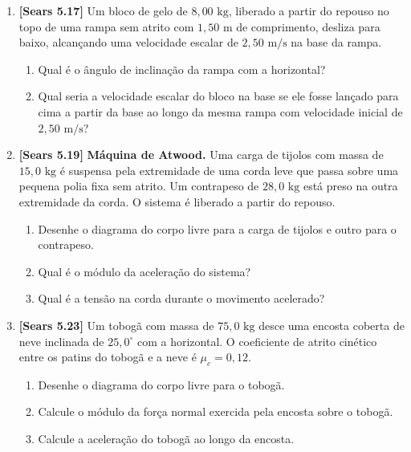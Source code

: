 \documentclass[11pt,a4paper]{article}
\begin{document}
\begin{enumerate}[label=\textbf{\arabic*.}, leftmargin=*, itemsep=0.45cm, resume]
\item \textbf{[Sears 5.17]} Um bloco de gelo de $8,00\text{ kg}$, liberado a partir do repouso no topo de uma rampa sem atrito com $1,50\text{ m}$ de comprimento, desliza para baixo, alcançando uma velocidade escalar de $2,50\text{ m/s}$ na base da rampa.
\begin{enumerate}[label=\alph*)]
    \item Qual é o ângulo de inclinação da rampa com a horizontal?
    \item Qual seria a velocidade escalar do bloco na base se ele fosse lançado para cima a partir da base ao longo da mesma rampa com velocidade inicial de $2,50\text{ m/s}$?
\end{enumerate}

\item \textbf{[Sears 5.19]} \textbf{Máquina de Atwood.} Uma carga de tijolos com massa de $15,0\text{ kg}$ é suspensa pela extremidade de uma corda leve que passa sobre uma pequena polia fixa sem atrito. Um contrapeso de $28,0\text{ kg}$ está preso na outra extremidade da corda. O sistema é liberado a partir do repouso.
\begin{enumerate}[label=\alph*)]
    \item Desenhe o diagrama do corpo livre para a carga de tijolos e outro para o contrapeso.
    \item Qual é o módulo da aceleração do sistema?
    \item Qual é a tensão na corda durante o movimento acelerado?
\end{enumerate}

\item \textbf{[Sears 5.23]} Um tobogã com massa de $75,0\text{ kg}$ desce uma encosta coberta de neve inclinada de $25,0^\circ$ com a horizontal. O coeficiente de atrito cinético entre os patins do tobogã e a neve é $\mu_c = 0,12$.
\begin{enumerate}[label=\alph*)]
    \item Desenhe o diagrama do corpo livre para o tobogã.
    \item Calcule o módulo da força normal exercida pela encosta sobre o tobogã.
    \item Calcule a aceleração do tobogã ao longo da encosta.
\end{enumerate}


\end{enumerate}
\end{document}
